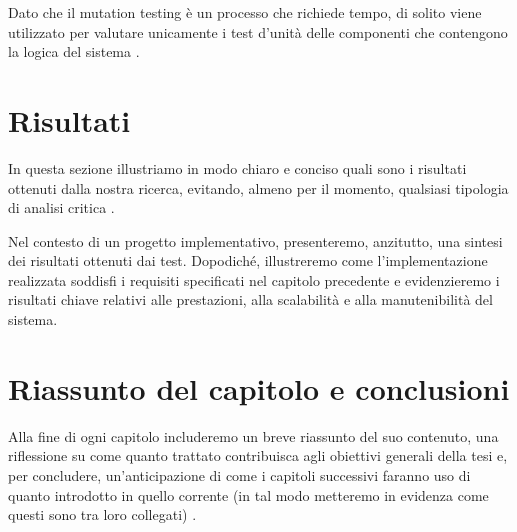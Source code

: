 \medskip

Dato che il mutation testing è un processo che richiede tempo, di solito viene utilizzato per valutare unicamente i test d'unità delle componenti che contengono la logica del sistema \cite{bettini2021tdd}.

\section{Risultati}

In questa sezione illustriamo in modo chiaro e conciso quali sono i risultati ottenuti dalla nostra ricerca, evitando, almeno per il momento, qualsiasi tipologia di analisi critica \cite{mannisto2022guide}.

\medskip

Nel contesto di un progetto implementativo, presenteremo, anzitutto, una sintesi dei risultati ottenuti dai test. Dopodiché, illustreremo come l'implementazione realizzata soddisfi i requisiti specificati nel capitolo precedente e evidenzieremo i risultati chiave relativi alle prestazioni, alla scalabilità e alla manutenibilità del sistema.

\section{Riassunto del capitolo e conclusioni}

Alla fine di ogni capitolo includeremo un breve riassunto del suo contenuto, una riflessione su come quanto trattato contribuisca agli obiettivi generali della tesi e, per concludere, un'anticipazione di come i capitoli successivi faranno uso di quanto introdotto in quello corrente (in tal modo metteremo in evidenza come questi sono tra loro collegati) \cite{zobel2015writing}.